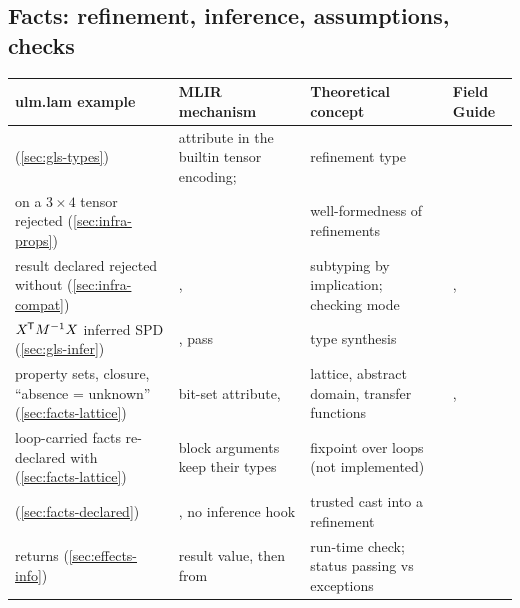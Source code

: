 \subsection*{Facts: refinement, inference, assumptions, checks}
{\small
\begin{tabularx}{\linewidth}{@{}P{3.6cm}P{4.0cm}LP{2.0cm}@{}}
\toprule
\textbf{ulm.lam example} & \textbf{MLIR mechanism} & \textbf{Theoretical concept} & \textbf{Field Guide} \\
\midrule
{} (\cref{sec:gls-types}) & attribute in the builtin tensor encoding;  & refinement type &  \\
 on a \(3\times4\) tensor rejected (\cref{sec:infra-props}) &  & well-formedness of refinements &  \\
result declared  rejected without  (\cref{sec:infra-compat}) & ,  & subtyping by implication; checking mode & ,  \\
\(X^{\mkern-1.5mu\mathsf{T}} M^{-1} X\) inferred SPD (\cref{sec:gls-infer}) & , pass  & type synthesis &  \\
property sets, closure, ``absence = unknown'' (\cref{sec:facts-lattice}) & bit-set attribute,  & lattice, abstract domain, transfer functions & ,  \\
loop-carried facts re-declared with  (\cref{sec:facts-lattice}) & block arguments keep their types & fixpoint over loops (not implemented) &  \\
 (\cref{sec:facts-declared}) & , no inference hook & trusted cast into a refinement &  \\
 returns  (\cref{sec:effects-info}) & result value, then  from  & run-time check; status passing vs exceptions &  \\
\bottomrule
\end{tabularx}
}

